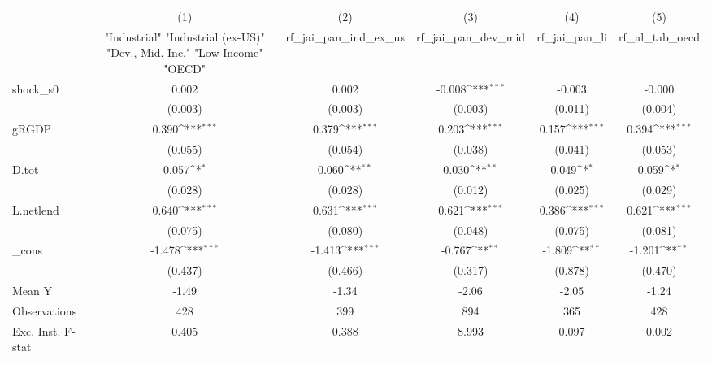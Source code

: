{
\def\sym#1{\ifmmode^{#1}\else\(^{#1}\)\fi}
\begin{tabular}{l*{5}{c}}
\toprule
            &\multicolumn{1}{c}{(1)}&\multicolumn{1}{c}{(2)}&\multicolumn{1}{c}{(3)}&\multicolumn{1}{c}{(4)}&\multicolumn{1}{c}{(5)}\\
            &\multicolumn{1}{c}{ "Industrial" "Industrial (ex-US)" "Dev., Mid.-Inc." "Low Income" "OECD" }&\multicolumn{1}{c}{rf\_jai\_pan\_ind\_ex\_us}&\multicolumn{1}{c}{rf\_jai\_pan\_dev\_mid}&\multicolumn{1}{c}{rf\_jai\_pan\_li}&\multicolumn{1}{c}{rf\_al\_tab\_oecd}\\
\midrule
shock\_s0    &       0.002         &       0.002         &      -0.008\sym{***}&      -0.003         &      -0.000         \\
            &     (0.003)         &     (0.003)         &     (0.003)         &     (0.011)         &     (0.004)         \\
\addlinespace
gRGDP       &       0.390\sym{***}&       0.379\sym{***}&       0.203\sym{***}&       0.157\sym{***}&       0.394\sym{***}\\
            &     (0.055)         &     (0.054)         &     (0.038)         &     (0.041)         &     (0.053)         \\
\addlinespace
D.tot       &       0.057\sym{*}  &       0.060\sym{**} &       0.030\sym{**} &       0.049\sym{*}  &       0.059\sym{*}  \\
            &     (0.028)         &     (0.028)         &     (0.012)         &     (0.025)         &     (0.029)         \\
\addlinespace
L.netlend   &       0.640\sym{***}&       0.631\sym{***}&       0.621\sym{***}&       0.386\sym{***}&       0.621\sym{***}\\
            &     (0.075)         &     (0.080)         &     (0.048)         &     (0.075)         &     (0.081)         \\
\addlinespace
\_cons      &      -1.478\sym{***}&      -1.413\sym{***}&      -0.767\sym{**} &      -1.809\sym{**} &      -1.201\sym{**} \\
            &     (0.437)         &     (0.466)         &     (0.317)         &     (0.878)         &     (0.470)         \\
\midrule
Mean Y      &       -1.49         &       -1.34         &       -2.06         &       -2.05         &       -1.24         \\
Observations&         428         &         399         &         894         &         365         &         428         \\
Exc. Inst. F-stat&       0.405         &       0.388         &       8.993         &       0.097         &       0.002         \\
\bottomrule
\end{tabular}
}

